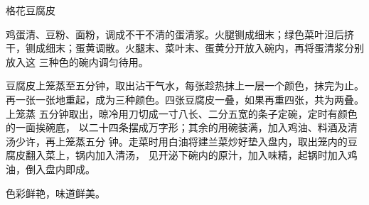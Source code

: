 %
%
%
%
%
%
%
\begin{recipe}{格花豆腐皮}

\ingredients


\preparation

\step 鸡蛋清、豆粉、面粉，调成不干不清的蛋清浆。火腿铡成细末；绿色菜叶泹后挤
干，铡成细末；蛋黄调散。火腿末、菜叶末、蛋黄分开放入碗内，再将蛋清浆分别放入这
三种色的碗内调匀待用。

\step 豆腐皮上笼蒸至五分钟，取出沾干气水，每张趁热抹上一层一个颜色，抹完为止。
再一张一张地重起，成为三种颜色。四张豆腐皮一叠，如果再重四张，共为两叠。上笼蒸
五分钟取出，晾冷用刀切成一寸八长、二分五宽的条子定碗，定时有颜色的一面挨碗底，
以二十四条摆成万字形；其余的用碗装满，加入鸡油、料酒及清汤少许，再上笼蒸五分
钟。走菜时用白油将建兰菜炒好垫入盘内，取出笼内的豆腐皮翻入菜上，锅内加入清汤，
见开泌下碗内的原汁，加入味精，起锅时加入鸡油，倒入盘内即成。

\features

色彩鲜艳，味道鲜美。

\end{recipe}

